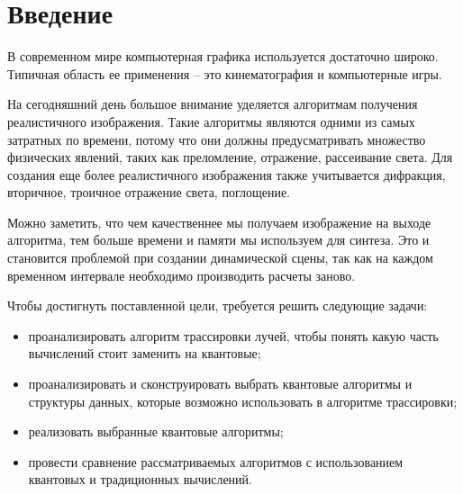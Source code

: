 \chapter*{Введение}

В современном мире компьютерная графика используется достаточно широко. Типичная область ее применения – это кинематография и компьютерные игры.

На сегодняшний день большое внимание уделяется алгоритмам получения реалистичного изображения. Такие алгоритмы являются одними из самых затратных по времени, потому что они должны предусматривать множество физических явлений, таких как преломление, отражение, рассеивание света. Для создания еще более реалистичного изображения также учитывается дифракция, вторичное, троичное отражение света, поглощение. 

Можно заметить, что чем качественнее мы получаем изображение на выходе алгоритма, тем больше времени и памяти мы используем для синтеза. Это и становится проблемой при создании динамической сцены, так как на каждом временном интервале необходимо производить расчеты заново. 


Чтобы достигнуть поставленной цели, требуется решить следующие задачи:

\begin{itemize}
    \item проанализировать алгоритм трассировки лучей, чтобы понять какую часть вычислений стоит заменить на квантовые;
    \item проанализировать и сконструировать выбрать квантовые алгоритмы и структуры данных, которые возможно использовать в алгоритме трассировки;
    \item реализовать выбранные квантовые алгоритмы;
    \item провести сравнение рассматриваемых алгоритмов с использованием квантовых и традиционных вычислений.
\end{itemize}
